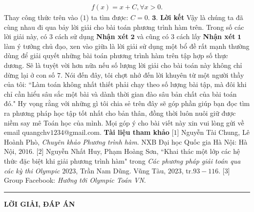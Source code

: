 \begin{multicols}{2}
	\begin{align*}
		f(x) = x + C,\forall x > 0. 
	\end{align*}
	Thay công thức trên vào ($1$) ta tìm được: $C = 0$.
	\vskip 0.1cm  
	\columnbreak
	$\pmb{3.}$	\textbf{\color{hoccungpi}Lời kết}
	\vskip 0.1cm
	Vậy là chúng ta đã cùng nhau đi qua bảy lời giải cho bài toán phương trình hàm trên. Trong số các lời giải này, có $3$ cách sử dụng \textbf{\color{hoccungpi}Nhận xét} $\pmb2$ và cũng có $3$ cách lấy \textbf{\color{hoccungpi}Nhận xét} $\pmb1$ làm ý tưởng chủ đạo, xen vào giữa là lời giải sử dụng một bổ đề rất mạnh thường dùng để giải quyết những bài toán phương trình hàm trên tập hợp số thực dương. Sẽ là tuyệt vời hơn nữa nếu số lượng lời giải cho bài toán này không chỉ dừng lại ở con số $7$.  Nói đến đây, tôi chợt nhớ đến lời khuyên từ một người thầy của tôi: ``Làm toán không nhất thiết phải chạy theo số lượng bài tập, mà đôi khi chỉ cần hiểu sâu sắc một bài và dành thời gian đào sâu bản chất của bài toán đó." Hy vọng rằng với những gì tôi chia sẻ trên đây sẽ góp phần giúp bạn đọc tìm ra phương pháp học tập tốt nhất cho bản thân, đồng thời luôn nuôi giữ được niềm say mê Toán học của mình. 
	Mọi góp ý cho bài viết này xin vui lòng gửi về email quangchv$1234$@gmail.com.
	\vskip 0.1cm
	\textbf{\color{hoccungpi}Tài liệu tham khảo}
	\vskip 0.1cm
	[$1$] Nguyễn Tài Chung, Lê Hoành Phò, \textit{Chuyên khảo Phương trình hàm}. NXB Đại học Quốc gia Hà Nội: Hà Nội, $2016$.
	\vskip 0.1cm
	[$2$] Nguyễn Nhất Huy, Phạm Hoàng Sơn, ``Khai thác một lớp các hệ thức đặc biệt khi giải phương trình hàm" trong \textit{Các phương pháp giải toán qua các kỳ thi Olympic $2023$}, Trần Nam Dũng. Vũng Tàu, $2023$, tr.$93-116$.
	\vskip 0.1cm  
	[$3$] Group Facebook: \textit{Hướng tới Olympic Toán VN}.
\end{multicols}
\vspace*{-10pt}
\rule{1\linewidth}{0.1pt}
\vskip 0.2cm
\centerline{\LARGE{\textbf{\color{hoccungpi}LỜI GIẢI, ĐÁP ÁN}}}
\vskip 0.2cm
